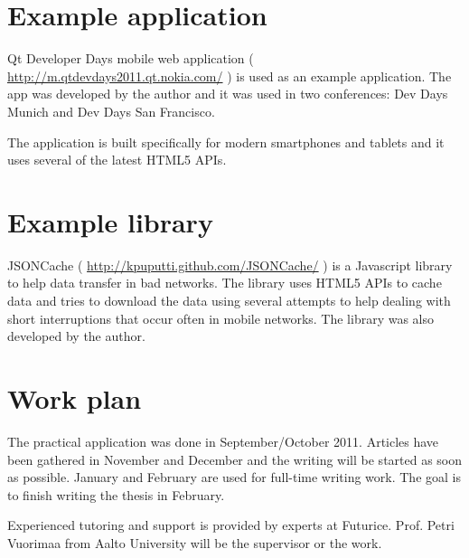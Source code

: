\documentclass[a4paper,12pt]{article}
\begin{document}
\section{Example application}

Qt Developer Days mobile web application (
\url{http://m.qtdevdays2011.qt.nokia.com/} ) is used as an example
application. The app was developed by the author and it was used in
two conferences: Dev Days Munich and Dev Days San Francisco.

The application is built specifically for modern smartphones and
tablets and it uses several of the latest HTML5 APIs.

\section{Example library}

JSONCache ( \url{http://kpuputti.github.com/JSONCache/} ) is a
Javascript library to help data transfer in bad networks. The library
uses HTML5 APIs to cache data and tries to download the data using
several attempts to help dealing with short interruptions that occur
often in mobile networks. The library was also developed by the
author.

\section{Work plan}

The practical application was done in September/October 2011. Articles
have been gathered in November and December and the writing will be
started as soon as possible. January and February are used for
full-time writing work. The goal is to finish writing the thesis in
February.

Experienced tutoring and support is provided by experts at
Futurice. Prof. Petri Vuorimaa from Aalto University will be the
supervisor or the work.
\end{document}
